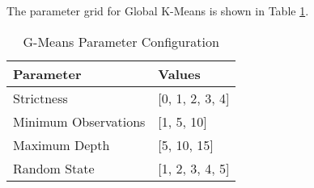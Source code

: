 The parameter grid for Global K-Means is shown in Table \ref{tab:gmeansparams}.

\begin{table}[h!]
\centering
\caption{G-Means Parameter Configuration}
\label{tab:gmeansparams}
\begin{tabularx}{\columnwidth}{|X|X|}
\hline
\textbf{Parameter} & \textbf{Values}\\ \hline
Strictness & [0, 1, 2, 3, 4] \\ \hline
Minimum Observations & [1, 5, 10] \\ \hline
Maximum Depth & [5, 10, 15] \\ \hline
Random State & [1, 2, 3, 4, 5] \\ \hline
\end{tabularx}
\end{table}



